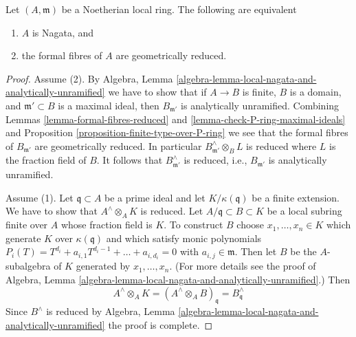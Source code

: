 \begin{lemma}
\label{lemma-Nagata-local-ring}
Let $(A, \mathfrak m)$ be a Noetherian local ring.
The following are equivalent
\begin{enumerate}
\item $A$ is Nagata, and
\item the formal fibres of $A$ are geometrically reduced.
\end{enumerate}
\end{lemma}

\begin{proof}
Assume (2). By
Algebra, Lemma \ref{algebra-lemma-local-nagata-and-analytically-unramified}
we have to show that if $A \to B$ is finite, $B$ is a domain,
and $\mathfrak m' \subset B$ is a maximal ideal, then $B_{\mathfrak m'}$
is analytically unramified.
Combining Lemmas \ref{lemma-formal-fibres-reduced} and
\ref{lemma-check-P-ring-maximal-ideals} and
Proposition \ref{proposition-finite-type-over-P-ring}
we see that the formal fibres of $B_{\mathfrak m'}$ are
geometrically reduced. In particular
$B_{\mathfrak m'}^\wedge \otimes_B L$ is reduced
where $L$ is the fraction field of $B$.
It follows that $B_{\mathfrak m'}^\wedge$ is reduced, i.e.,
$B_{\mathfrak m'}$ is analytically unramified.

\medskip\noindent
Assume (1). Let $\mathfrak q \subset A$ be a prime ideal
and let $K/\kappa(\mathfrak q)$ be a finite extension.
We have to show that $A^\wedge \otimes_A K$ is reduced.
Let $A/\mathfrak q \subset B \subset K$ be a local subring
finite over $A$ whose fraction field is $K$.
To construct $B$ choose $x_1, \ldots, x_n \in K$
which generate $K$ over $\kappa(\mathfrak q)$
and which satisfy monic polynomials
$P_i(T) = T^{d_i} + a_{i, 1} T^{d_i - 1} + \ldots + a_{i, d_i} = 0$
with $a_{i, j} \in \mathfrak m$. Then let $B$ be the $A$-subalgebra
of $K$ generated by $x_1, \ldots, x_n$. (For more details see
the proof of Algebra, Lemma
\ref{algebra-lemma-local-nagata-and-analytically-unramified}.)
Then
$$
A^\wedge \otimes_A K =
(A^\wedge \otimes_A B)_\mathfrak q =
B^\wedge_\mathfrak q
$$
Since $B^\wedge$ is reduced by  Algebra, Lemma
\ref{algebra-lemma-local-nagata-and-analytically-unramified}
the proof is complete.
\end{proof}